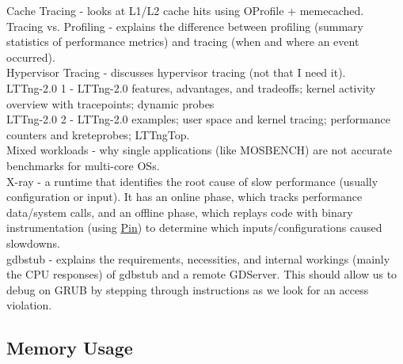 \documentclass{article}
\begin{document}
\noindent\cite{pesterev:acm2010-cacheperf} Cache Tracing - looks at L1/L2 cache hits using OProfile + memecached.\\

\noindent\cite{shende:elw1999-profiling} Tracing vs. Profiling - explains the difference between profiling (summary statistics of performance metrics) and tracing (when and where an event occurred).\\

\noindent\cite{desnoyers:linuxsymp2008-hypervisor} Hypervisor Tracing - discusses hypervisor tracing (not that I need it). \\

\noindent\cite{desnoyers:LWNnet2012-lttng1} LTTng-2.0 1 - LTTng-2.0 features, advantages, and tradeoffs; kernel activity overview with tracepoints; dynamic probes\\

\noindent\cite{desnoyers:LWNnet2012-lttng2} LTTng-2.0 2 - LTTng-2.0 examples; user space and kernel tracing; performance counters and kreteprobes; LTTngTop.\\

\noindent\cite{kuz:usenix2011-benchmarks} Mixed workloads - why single applications (like MOSBENCH) are not accurate benchmarks for multi-core OSs.\\

\noindent\cite{attariyan:osdi2012-xray} X-ray - a runtime that identifies the root cause of slow performance (usually configuration or input). It has an online phase, which tracks performance data/system calls, and an offline phase, which replays code with binary instrumentation (using \textcolor{magenta}{\href{http://download-software.intel.com/sites/default/files/article/256675/cgo2013.pdf}{Pin}}) to determine which inputs/configurations caused slowdowns.\\

\noindent\cite{tan:na-gdbstub} gdbstub - explains the requirements, necessities, and internal workings (mainly the CPU responses) of gdbstub and a remote GDServer.  This should allow us to debug on GRUB by stepping through instructions as we look for an access violation.

\subsection{Memory Usage}
\end{document}
